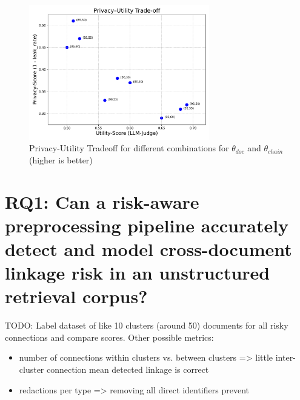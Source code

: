  
\begin{figure}[h]
    \centering
    \includegraphics[width=0.7\textwidth]{figures/c3_privacy_utility_tradeoff.pdf}
    \caption{Privacy-Utility Tradeoff for different combinations for  $\theta_{doc}$ and $\theta_{chain}$ (higher is better)}
    \label{approach-fig:privacy_utility_thetas}
\end{figure} 

\section{RQ1: Can a risk-aware preprocessing pipeline accurately detect and model cross-document linkage risk in an unstructured retrieval corpus?}
TODO: Label dataset of like 10 clusters (around 50) documents for all risky connections and compare scores.
Other possible metrics: 
\begin{itemize}
    \item number of connections within clusters vs. between clusters => little inter-cluster connection mean detected linkage is correct
    \item redactions per type => removing all direct identifiers prevent
\end{itemize}
